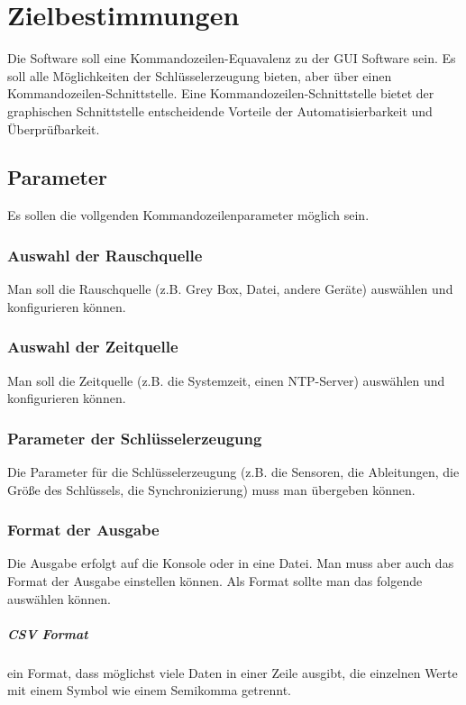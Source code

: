 \chapter{Zielbestimmungen}

Die Software soll eine Kommandozeilen-Equavalenz zu der GUI Software sein. Es
soll alle Möglichkeiten der Schlüsselerzeugung bieten, aber über einen
Kommandozeilen-Schnittstelle. Eine Kommandozeilen-Schnittstelle bietet der
graphischen Schnittstelle entscheidende Vorteile der Automatisierbarkeit und
Überprüfbarkeit.

\section{Parameter}

Es sollen die vollgenden Kommandozeilenparameter möglich sein.

\subsection{Auswahl der Rauschquelle}

Man soll die Rauschquelle (z.B. Grey Box, Datei, andere Geräte) auswählen und
konfigurieren können.

\subsection{Auswahl der Zeitquelle}

Man soll die Zeitquelle (z.B. die Systemzeit, einen NTP-Server) auswählen und
konfigurieren können.

\subsection{Parameter der Schlüsselerzeugung}

Die Parameter für die Schlüsselerzeugung (z.B. die Sensoren, die Ableitungen,
die Größe des Schlüssels, die Synchronizierung) muss man übergeben können.

\subsection{Format der Ausgabe}

Die Ausgabe erfolgt auf die Konsole oder in eine Datei. Man muss aber auch das
Format der Ausgabe einstellen können. Als Format sollte man das folgende
auswählen können.

\paragraph{CSV Format} ein Format, dass möglichst viele Daten in einer Zeile
ausgibt, die einzelnen Werte mit einem Symbol wie einem Semikomma getrennt.
